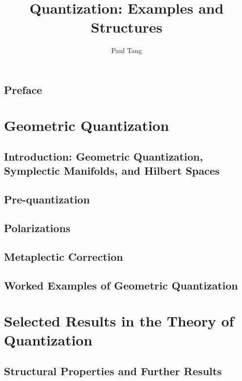 \documentclass{amsbook}
\title{Quantization: Examples and Structures}
\author{Paul Tang}
\begin{document}
\frontmatter

\maketitle

\tableofcontents

\chapter{Preface}



\part{Geometric Quantization}

\chapter{Introduction: Geometric Quantization, Symplectic Manifolds, and Hilbert Spaces}


\chapter{Pre-quantization}


\chapter{Polarizations}


\chapter{Metaplectic Correction}


\chapter{Worked Examples of Geometric Quantization}


\part{Selected Results in the Theory of Quantization}
\chapter{Structural Properties and Further Results}
\end{document}
